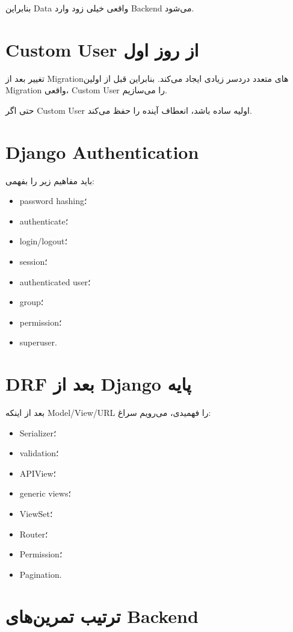 بنابراین Data واقعی خیلی زود وارد Backend می‌شود.

\section{Custom User از روز اول}

\begin{warningbox}
تغییر  بعد از Migrationهای متعدد دردسر زیادی ایجاد می‌کند. بنابراین قبل از اولین Migration واقعی، Custom User را می‌سازیم.
\end{warningbox}

حتی اگر Custom User اولیه ساده باشد، انعطاف آینده را حفظ می‌کند.

\section{Django Authentication}

باید مفاهیم زیر را بفهمی:
\begin{itemize}
  \item password hashing؛
  \item authenticate؛
  \item login/logout؛
  \item session؛
  \item authenticated user؛
  \item group؛
  \item permission؛
  \item superuser.
\end{itemize}

\section{DRF بعد از Django پایه}

بعد از اینکه Model/View/URL را فهمیدی، می‌رویم سراغ:
\begin{itemize}
  \item Serializer؛
  \item validation؛
  \item APIView؛
  \item generic views؛
  \item ViewSet؛
  \item Router؛
  \item Permission؛
  \item Pagination.
\end{itemize}

\section{ترتیب تمرین‌های Backend}

